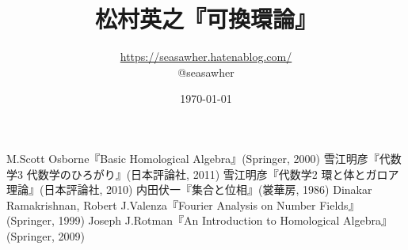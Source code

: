 \documentclass[12pt,dvipdfmx]{jsarticle}%
\begin{document}
\title{松村英之『可換環論』}
\author{\url{https://seasawher.hatenablog.com/} \\ @seasawher}
\date{\today}
\maketitle




\newpage


\newpage


\newpage


\newpage


\newpage


\newpage


\newpage


\newpage


\begin{thebibliography}{1}%
   M.Scott Osborne『Basic Homological Algebra』(Springer, 2000)
   雪江明彦『代数学3 代数学のひろがり』(日本評論社, 2011)
   雪江明彦『代数学2 環と体とガロア理論』(日本評論社, 2010)
   内田伏一『集合と位相』(裳華房, 1986)
   Dinakar Ramakrishnan, Robert J.Valenza『Fourier Analysis on Number Fields』(Springer, 1999)
   Joseph J.Rotman『An Introduction to Homological Algebra』(Springer, 2009)
\end{thebibliography}
\end{document}
